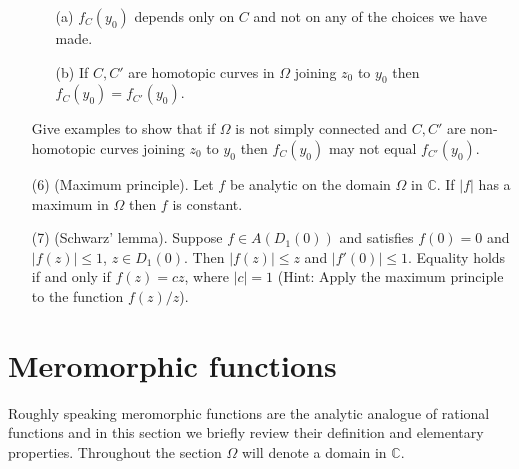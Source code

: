 \begin{enumerate}
\begin{enumerate}
\item[(a)] $f_C(y_0)$ depends only on $C$ and not on any of the choices we have made.
\item[(b)] If $C,C'$ are homotopic curves in $\Omega$ joining $z_0$ to $y_0$ then $f_C(y_0)=f_{C'}(y_0)$.
\end{enumerate}
Give examples to show that if $\Omega$ is not simply connected and $C,C'$ are non-homotopic curves joining $z_0$ to $y_0$ then $f_C(y_0)$ may not equal $f_{C'}(y_0)$.
\item[(6)] (Maximum principle). Let $f$ be analytic on the domain $\Omega$ in $\mathbb C$. If $|f|$ has a maximum in $\Omega$ then $f$ is constant.
\item[(7)] (Schwarz' lemma). Suppose $f\in A(D_1(0))$ and satisfies $f(0)=0$ and $|f(z)|\leq1$, $z\in D_1(0)$. Then $|f(z)|\leq z$ and $|f'(0)|\leq1$. Equality holds if and only if $f(z)=cz$, where $|c|=1$ (Hint: Apply the maximum principle to the function $f(z)/z$).
\end{enumerate}

\section{Meromorphic functions}\label{sec:1:2}
Roughly speaking meromorphic functions are the analytic analogue of rational functions and in this section we briefly review their definition and elementary properties. Throughout the section $\Omega$ will denote a domain in $\mathbb C$.

